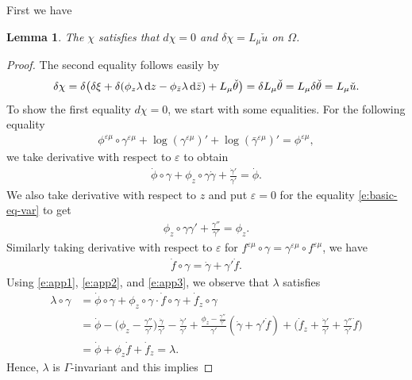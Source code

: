 \documentclass[pdftex]{sigma}%
\numberwithin{equation}{section}
\newtheorem{Lemma}[Theorem]{Lemma}
\newcommand{\vep}{\varepsilon}
\begin{document}
First we have
\begin{Lemma}%
The ${\chi}$ satisfies that $d\chi=0$ and $\delta\chi=L_\mu\check{u}$ on $\Omega$.
\end{Lemma}
\begin{proof}
The second equality follows easily by
\begin{gather*}
\delta\chi=\delta\big(\delta\xi + \delta(\phi_z \lambda \,{\rm d}z - \phi_{\bar{z}} \lambda\, {\rm d}\bar{z}) + L_{\mu} \check{\theta}\big) = \delta L_\mu \check{\theta}= L_\mu\delta\check{\theta}=L_\mu\check{u}.
\end{gather*}
To show the first equality $d\chi=0$, we start with some equalities. For the following equality
\begin{gather}\label{e:basic-eq-var}
\phi^{\vep\mu}\circ \gamma^{\vep\mu} +\log (\gamma^{\vep\mu})' +\log (\bar{\gamma}^{\vep\mu})' = \phi^{\vep\mu},
\end{gather}
we take derivative with respect to $\vep$ to obtain
\begin{gather}\label{e:app1}
\dot{\phi}\circ\gamma +\phi_z\circ \gamma \dot{\gamma} +\frac{\dot{\gamma}'}{\gamma'} =\dot{\phi}.
\end{gather}
We also take derivative with respect to $z$ and put $\vep=0$ for the equality \eqref{e:basic-eq-var} to get
\begin{gather}\label{e:app2}
\phi_z\circ\gamma \gamma' +\frac{\gamma''}{\gamma'} =\phi_z.
\end{gather}
Similarly taking derivative with respect to $\vep$ for $f^{\vep\mu}\circ \gamma=\gamma^{\vep\mu}\circ f^{\vep\mu}$, we have
\begin{gather}\label{e:app3}
\dot{f}\circ\gamma=\dot{\gamma}+ \gamma'\dot{f}.
\end{gather}
Using \eqref{e:app1}, \eqref{e:app2}, and \eqref{e:app3}, we observe that $\lambda$ satisfies
\begin{align*}
\lambda \circ \gamma &= \dot{\phi}\circ \gamma +\phi_z\circ \gamma \cdot \dot{f}\circ\gamma +\dot{f}_z\circ \gamma
\\
 &= \dot{\phi} -\bigg(\phi_z -\frac{\gamma''}{\gamma'}\bigg)\frac{\dot{\gamma}}{\gamma'} -\frac{\dot{\gamma}'}{\gamma'}
 + \frac{\phi_z-\frac{\gamma''}{\gamma'}}{\gamma'} (\dot{\gamma}+\gamma' \dot{f})
 + \bigg(\dot{f}_z+\frac{\dot{\gamma}'}{\gamma'} +\frac{\gamma''}{\gamma'} \dot{f}\bigg)
 \\
& = \dot{\phi}+\phi_z\dot{f} +\dot{f}_z =\lambda.
\end{align*}
Hence, $\lambda$ is $\Gamma$-invariant and this implies

\end{proof}
\end{document}
